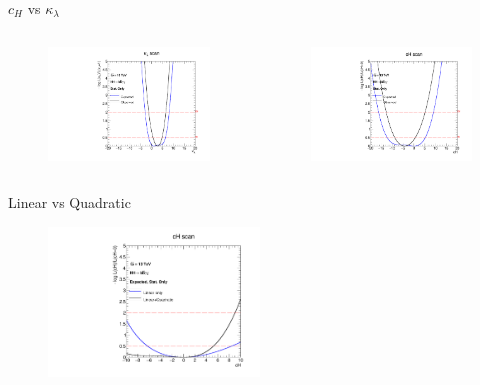 \begin{frame}{$c_{H}$ vs $\kappa_{\lambda}$}
\begin{columns}
\begin{figure}
    \centering
    \includegraphics[width=1.\textwidth]{BackUp/Part5/Img/likelihood_subplot_kl.pdf}
\end{figure}
\begin{figure}
    \centering
    \includegraphics[width=1.\textwidth]{BackUp/Part5/Img/likelihood_subplot_cH.pdf}
\end{figure}
\end{columns}
\end{frame}

\begin{frame}{Linear vs Quadratic}

\begin{figure}
    \centering
    \includegraphics[width=0.5\textwidth]{BackUp/Part5/Img/likelihood_subplot_cp_lin_vs_quad_Exp.pdf}
\end{figure}
    
\end{frame}


